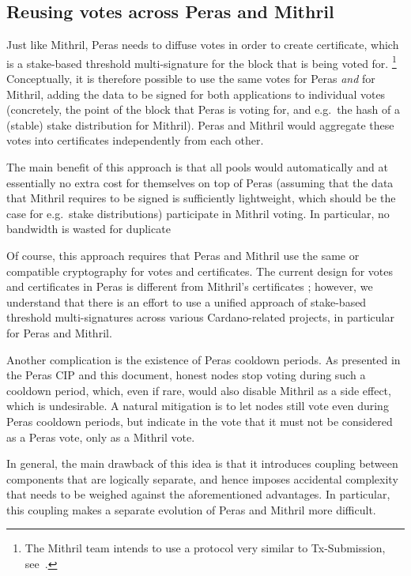 \subsection{Reusing votes across Peras and Mithril}\label{sec:mithril reuse votes}
Just like Mithril, Peras needs to diffuse votes in order to create certificate, which is a stake-based threshold multi-signature for the block that is being voted for.%
\footnote{The Mithril team intends to use a protocol very similar to Tx-Submission, see~\cite{dmq-cip}.}
Conceptually, it is therefore possible to use the same votes for Peras \emph{and} for Mithril, adding the data to be signed for both applications to individual votes (concretely, the point of the block that Peras is voting for, and e.g.\ the hash of a (stable) stake distribution for Mithril).
Peras and Mithril would aggregate these votes into certificates independently from each other.

The main benefit of this approach is that all pools would automatically and at essentially no extra cost for themselves on top of Peras (assuming that the data that Mithril requires to be signed is sufficiently lightweight, which should be the case for e.g.\ stake distributions) participate in Mithril voting.
In particular, no bandwidth is wasted for duplicate

Of course, this approach requires that Peras and Mithril use the same or compatible cryptography for votes and certificates.
The current design for votes and certificates in Peras \parencite{peras-cert-report} is different from Mithril's certificates \parencite{chaidos2024mithril}; however, we understand that there is an effort to use a unified approach of stake-based threshold multi-signatures across various Cardano-related projects, in particular for Peras and Mithril.

Another complication is the existence of Peras cooldown periods.
As presented in the Peras CIP \parencite{peras-cip} and this document, honest nodes stop voting during such a cooldown period, which, even if rare, would also disable Mithril as a side effect, which is undesirable.
A natural mitigation is to let nodes still vote even during Peras cooldown periods, but indicate in the vote that it must not be considered as a Peras vote, only as a Mithril vote.

In general, the main drawback of this idea is that it introduces coupling between components that are logically separate, and hence imposes accidental complexity that needs to be weighed against the aforementioned advantages.
In particular, this coupling makes a separate evolution of Peras and Mithril more difficult.

